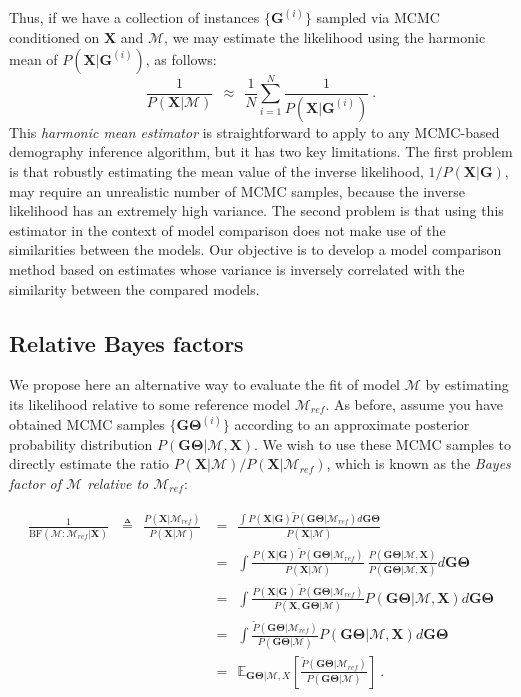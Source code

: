 \documentclass[11pt]{article}
\newcommand{\vect}[1]{\boldsymbol{\mathbf{#1}}}
\newcommand{\E}{\mathbb{E}}
\newcommand{\X}{\vect{X}}
\newcommand{\M}{\mathcal{M}}
\newcommand{\G}{\vect{G}}
\newcommand{\T}{\vect{\Theta}}
\newcommand{\GT}{\G\T}
\newcommand{\Mref}{\M_{ref}}
\newcommand{\Pref}{\widetilde{P}}
\newcommand{\rbf}{\text{BF}}
\begin{document}
Thus, if we have a collection of instances $\{\G^{(i)}\}$ sampled via MCMC conditioned on $\X$ and $\M$, we may
estimate the likelihood using the {harmonic mean} of $P(\X|\G^{(i)})$, as follows:
%
%
\begin{equation}\label{eq:harmonic}
 \frac{1}{P(\X|\M)} ~~\approx~~ \frac{1}{N} \sum_{i=1}^{N}\frac{1}{P(\X|\G^{(i)})} ~.
\end{equation}
%
%
This {\em harmonic mean estimator} is straightforward to apply to any MCMC-based demography
inference algorithm, but it has two key limitations.
%
The first problem is that robustly estimating the mean value of the inverse likelihood, $1/P(\X|\G)$,
may require an unrealistic number of MCMC samples, because the inverse likelihood has an extremely high variance.
%
The second problem is that using this estimator in the context of model comparison does not make use of the
similarities between the models.
%
Our objective is to develop a model comparison method based on estimates whose variance is inversely correlated with the
similarity between the compared models.

\subsection*{Relative Bayes factors}

We propose here an alternative way to evaluate the fit of model $\M$ by estimating its likelihood relative to some
reference model $\Mref$. 
%
As before, assume you have obtained MCMC samples $\{\GT^{(i)}\}$ according to an approximate posterior probability distribution $P(\GT|\M,\X)$.
%
We wish to use these MCMC samples to directly estimate the ratio $P(\X|\M) / P(\X|\Mref)$, which is known as the {\em Bayes factor of $\M$ relative to $\Mref$}:
%
%
\begin{small}
\begin{align}
\frac{1}{\rbf(\M:\Mref|\X)} ~~~ \triangleq ~~ \frac{P(\X|\Mref)}{P(\X|\M)}
&=~~ \frac{\int P(\X|\G) \Pref(\GT|\Mref)d\GT}{P(\X|\M)} \label{eq:pref} \\ %
&=~~ \int \frac{P(\X|\G)\ \Pref(\GT|\Mref) }{P(\X|\M)} \ \frac{P(\GT|\M, \X)}{P(\GT|\M, \X)}  d\GT \label{eq:pref_nonzero} \\ %
&=~~ \int \frac{P(\X|\G)\ \Pref(\GT|\Mref) }{P(\X,\GT|\M)} P(\GT|\M, \X)  d\GT \label{eq:needlabel} \\ %
&=~~ \int \frac{\Pref(\GT|\Mref) }{P(\GT|\M)} P(\GT|\M, \X)  d\GT  \label{eq:data_cancel}\\ %
&=~~ \E_{\GT|\M,X } \left[\frac{\Pref(\GT|\Mref) }{P(\GT|\M)}\right]~.\label{eq:is_rbf}
\end{align}
\end{small}
\end{document}
